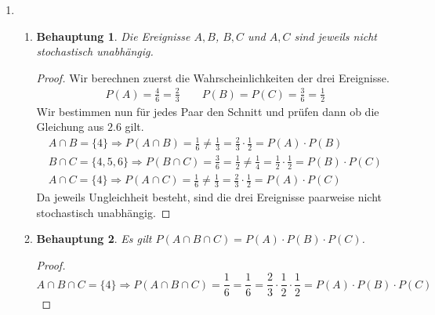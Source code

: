 \documentclass[a4paper]{scrartcl}
\newtheorem*{behaupt}{Behauptung}
\begin{document}
\begin{enumerate}[label=\bfseries\arabic*.]
    \item	        
        \begin{enumerate}[label=(\alph*)]
            \item
                \begin{behaupt}
                    Die Ereignisse $A, B$, $B, C$ und $A, C$ sind jeweils nicht
                    stochastisch unabhängig.
                \end{behaupt}
                \begin{proof}
                Wir berechnen zuerst die Wahrscheinlichkeiten der drei
                Ereignisse.
                \begin{align*}
                    P(A) = \frac{4}{6} = \frac{2}{3}
                    \qquad
                    P(B) = P(C) = \frac{3}{6} = \frac{1}{2}
                \end{align*}
                Wir bestimmen nun für jedes Paar den Schnitt und prüfen dann ob
                die Gleichung aus $2.6$ gilt.
                \begin{gather*}
                    A \cap B = \{4\} \Rightarrow P(A \cap B) = \frac{1}{6} \neq
                    \frac{1}{3} = \frac{2}{3} \cdot \frac{1}{2}
                    = P(A) \cdot P(B)
                    \\
                    B \cap C =\{4,5,6\} \Rightarrow P(B \cap C) = \frac{3}{6} =
                    \frac{1}{2} \neq \frac{1}{4} = \frac{1}{2} \cdot \frac{1}{2}
                    = P(B) \cdot P(C)
                    \\
                    A \cap C = \{4\} \Rightarrow P(A \cap C) = \frac{1}{6} \neq
                    \frac{1}{3} = \frac{2}{3} \cdot \frac{1}{2}
                    = P(A) \cdot P(C)
                \end{gather*}
                Da jeweils Ungleichheit besteht, sind die drei Ereignisse
                paarweise nicht stochastisch unabhängig.
                \end{proof}
                
            \item
                \begin{behaupt}
                    Es gilt $P(A \cap B \cap C) = P(A) \cdot P(B) \cdot P(C)$.
                \end{behaupt}
                \begin{proof}
                    \begin{equation*}
                        A \cap B \cap C = \{4\} \Rightarrow P(A\cap B\cap C)
                        = \frac{1}{6} = \frac{1}{6} = \frac{2}{3}
                        \cdot \frac{1}{2} \cdot \frac{1}{2}
                        = P(A) \cdot P(B) \cdot P(C)
                    \end{equation*}
                \end{proof}
                

\end{enumerate}
\end{enumerate}
\end{document}
